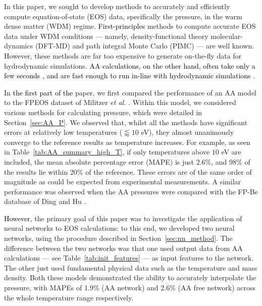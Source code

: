 \documentclass[%
 preprint,
 superscriptaddress,
 amsmath,amssymb,
longbibliography,
]{revtex4-2}
\newcommand{\change}[1]{\textcolor{black}{#1}}
\begin{document}
In this paper, we sought to develop methods to accurately and efficiently compute equation-of-state (EOS) data, specifically the pressure, in the warm dense matter (WDM) regime. %
\change{First-principles} methods to compute accurate EOS data under WDM conditions --- namely, density-functional theory molecular-dynamics (DFT-MD) and path integral Monte Carlo (PIMC) --- are well known. However, these methods are far too expensive to generate on-the-fly data for hydrodynamic simulations. \change{AA calculations, on the other hand, often take only a few seconds \cite{Massacrier_bands_2021}, and are fast enough to run in-line with hydrodynamic simulations \cite{Hansen_fast_AA, XSN_ref_2}.} 


In \change{the first part of the} paper, we first compared the performance of an AA model to the FPEOS dataset of Militzer \emph{et al.} \cite{Militzer_EOS_database}. Within this model, we considered various methods for calculating pressure, which were detailed in Section~\ref{sec:AA_P}. We observed that, whilst all the methods have significant errors at relatively low temperatures ($\lessapprox 10$ eV), they almost unanimously converge to the reference results as temperature increases. For example, as seen in Table~\ref{tab:AA_summary_high_T}, if only temperatures above $10$ eV are included, the mean absolute percentage error (MAPE) is just 2.6\%, and 98\% of the results lie within 20\% of the reference. These errors are of the same order of magnitude as could be expected from experimental measurements.
A similar performance was observed when the AA pressures were compared with the FP-Be database of Ding and Hu \cite{Hu_Be_EOS}.

\change{However}, the primary goal of this paper was to investigate the application of neural networks to EOS calculations: to this end, we developed two neural networks, using the procedure described in Section~\ref{sec:nn_method}. The difference between the two networks was that one used output data from AA calculations --- see Table~\ref{tab:init_features} --- as input features to the network. The other just used fundamental physical data such as the temperature and mass density. Both these models demonstrated the ability to accurately interpolate the pressure, with MAPEs of 1.9\% (AA network) and 2.6\% (AA free network) across the whole temperature range respectively.
\end{document}
